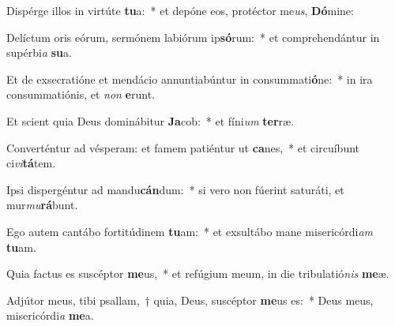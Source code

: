 \item Dispérge illos in virtúte \textbf{tu}a:~* et depóne eos, protéctor me\textit{us}, \textbf{Dó}mine:
\item Delíctum oris eórum, sermónem labiórum ip\textbf{só}rum:~* et comprehendántur in supérbi\textit{a} \textbf{su}a.
\item Et de exsecratióne et mendácio annuntiabúntur in consummati\textbf{ó}ne:~* in ira consummatiónis, et \textit{non} \textbf{e}runt.
\item Et scient quia Deus dominábitur \textbf{Ja}cob:~* et fíni\textit{um} \textbf{ter}ræ.
\item Converténtur ad vésperam: et famem patiéntur ut \textbf{ca}nes,~* et circuíbunt ci\textit{vi}\textbf{tá}tem.
\item Ipsi dispergéntur ad mandu\textbf{cán}dum:~* si vero non fúerint saturáti, et mur\textit{mu}\textbf{rá}bunt.
\item Ego autem cantábo fortitúdinem \textbf{tu}am:~* et exsultábo mane misericórdi\textit{am} \textbf{tu}am.
\item Quia factus es suscéptor \textbf{me}us,~* et refúgium meum, in die tribulatió\textit{nis} \textbf{me}æ.
\item Adjútor meus, tibi psallam,~† quia, Deus, suscéptor \textbf{me}us es:~* Deus meus, misericórdi\textit{a} \textbf{me}a.
